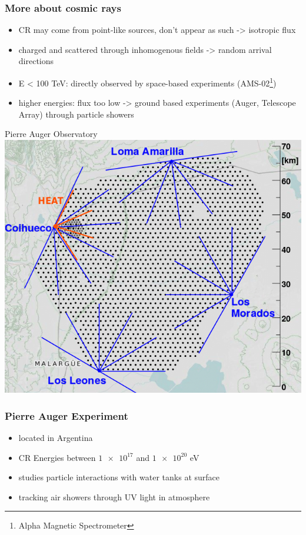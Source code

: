 \documentclass[aspectratio=1610, 9pt]{beamer}
\begin{document}
\begin{frame}\frametitle{More about cosmic rays}
  \begin{itemize}
    \item CR may come from point-like sources, don't appear as such -> isotropic flux
    \item charged and scattered through inhomogenous fields -> random arrival directions
    \item E < 100 TeV: directly observed by space-based experiments (AMS-02\footnote{Alpha Magnetic Spectrometer})
    \item higher energies: flux too low -> ground based experiments
    (Auger, Telescope Array) through particle showers
  \end{itemize}
\end{frame}

\begin{frame}{Pierre Auger Observatory}
  \includegraphics[width=\textwidth]{pierre.png}
\end{frame}

\begin{frame}\frametitle{Pierre Auger Experiment}
  \begin{itemize}
    \item located in Argentina
    \item CR Energies between $\num{1e17}$ and $\num{1e20}$ eV
    \item studies particle interactions with water tanks at surface
    \item tracking air showers through UV light in atmosphere
  \end{itemize}
\end{frame}
\end{document}
